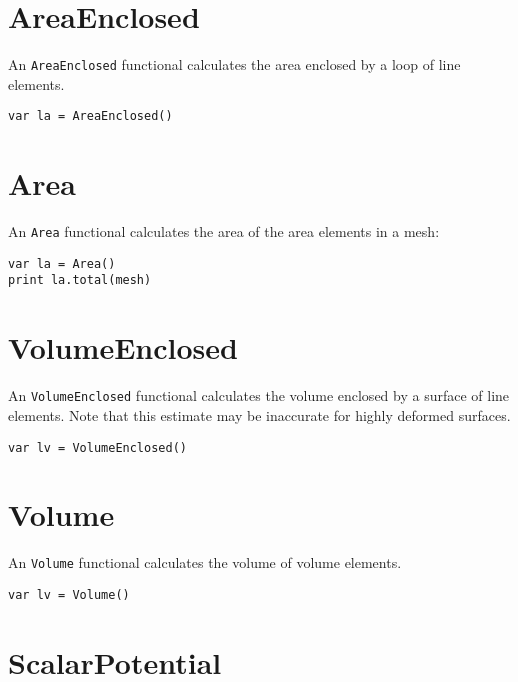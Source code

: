 \hypertarget{areaenclosed}{%
\section{AreaEnclosed}\label{areaenclosed}}

An \texttt{AreaEnclosed} functional calculates the area enclosed by a
loop of line elements.

\begin{lstlisting}
var la = AreaEnclosed()
\end{lstlisting}

\hypertarget{area}{%
\section{Area}\label{area}}

An \texttt{Area} functional calculates the area of the area elements in
a mesh:

\begin{lstlisting}
var la = Area()
print la.total(mesh)
\end{lstlisting}

\hypertarget{volumeenclosed}{%
\section{VolumeEnclosed}\label{volumeenclosed}}

An \texttt{VolumeEnclosed} functional calculates the volume enclosed by
a surface of line elements. Note that this estimate may be inaccurate
for highly deformed surfaces.

\begin{lstlisting}
var lv = VolumeEnclosed()
\end{lstlisting}

\hypertarget{volume}{%
\section{Volume}\label{volume}}

An \texttt{Volume} functional calculates the volume of volume elements.

\begin{lstlisting}
var lv = Volume()
\end{lstlisting}

\hypertarget{scalarpotential}{%
\section{ScalarPotential}\label{scalarpotential}}

